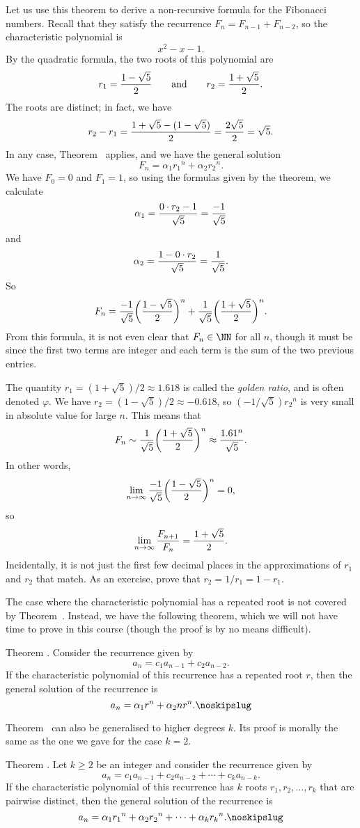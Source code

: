 Let us use this theorem to derive a non-recursive formula for the Fibonacci numbers.
Recall that they satisfy the recurrence $F_n = F_{n-1} + F_{n-2}$, so the characteristic
polynomial is
$$x^2 - x - 1.$$
By the quadratic formula, the two roots of this polynomial are
$$r_1 = {1 - \sqrt 5\over 2}\qquad\hbox{and}\qquad r_2 = {1+\sqrt 5\over 2}.$$
The roots are distinct; in fact, we have
$$r_2 - r_1 = {1+\sqrt 5 - (1-\sqrt 5)\over 2} = {2\sqrt 5\over 2} = \sqrt 5.$$
In any case, Theorem~{\thmdegtwodistinct} applies, and we have the general
solution
$$F_n = \alpha_1 {r_1}^n + \alpha_2 {r_2}^n.$$
We have $F_0 = 0$ and $F_1 = 1$, so using the formulas given by the theorem,
we calculate
$$\alpha_1 = {0\cdot r_2 - 1\over \sqrt 5} = {-1\over \sqrt 5}$$
and
$$\alpha_2 = {1 - 0\cdot r_2\over \sqrt 5} = {1\over \sqrt 5}.$$
So
$$F_n = {-1\over \sqrt 5}\biggl({1 - \sqrt 5\over 2}\biggr)^n
+ {1\over \sqrt 5}\biggl({1+\sqrt 5\over 2}\biggr)^n.$$
From this formula, it is not even clear that $F_n \in \NN$ for all $n$, though it must be
since the first two terms are integer and each term is the sum of the two previous entries.

The quantity $r_1 = (1+\sqrt 5)/2\approx 1.618$ is called the {\it golden ratio}, and is
often denoted $\varphi$.
We have $r_2 = (1-\sqrt 5)/2 \approx -0.618$, so $(-1/\sqrt 5){r_2}^n$ is very small in absolute value
for large $n$.
This means that
$$ F_n \sim {1\over \sqrt 5} \biggl( {1+\sqrt 5\over 2}\biggr)^n \approx {1.61^n\over \sqrt 5}.$$
In other words,
$$\lim_{n\to\infty} {-1\over \sqrt 5}\biggl({1 - \sqrt 5\over 2}\biggr)^n = 0,$$
so
$$\lim_{n\to \infty} {F_{n+1}\over F_n} = {1+\sqrt 5\over 2}.$$
Incidentally, it is not just the first few decimal places in the approximations of $r_1$ and $r_2$
that match. As an exercise, prove that $r_2 = 1/r_1 = 1-r_1$.

The case where the characteristic polynomial has a repeated root is not covered by
Theorem~{\thmdegtwodistinct}. Instead, we have the following theorem, which we will
not have time to prove in this course (though the proof is by no means difficult).

\proclaim Theorem \advthm. Consider the recurrence given by
$$a_n = c_1 a_{n-1} + c_2 a_{n-2}.$$
If the characteristic polynomial of this recurrence has a repeated root $r$,
then the general solution of the recurrence is
$$a_n = \alpha_1 r^n + \alpha_2 nr^n.\noskipslug$$

Theorem~{\thmdegtwodistinct} can also be generalised to higher degrees $k$. Its proof is
morally the same as the one we gave for the case $k=2$.

\proclaim Theorem \advthm. Let $k\ge 2$ be an integer and consider the recurrence given by
$$a_n = c_1 a_{n-1} + c_2 a_{n-2} + \cdots + c_k a_{n-k}.$$
If the characteristic polynomial of this recurrence has $k$ roots
$r_1,r_2,\ldots, r_k$ that are pairwise distinct, then
the general solution of the recurrence is
$$a_n = \alpha_1 {r_1}^n + \alpha_2 {r_2}^n + \cdots + \alpha_k {r_k}^n.\noskipslug$$


\bye
